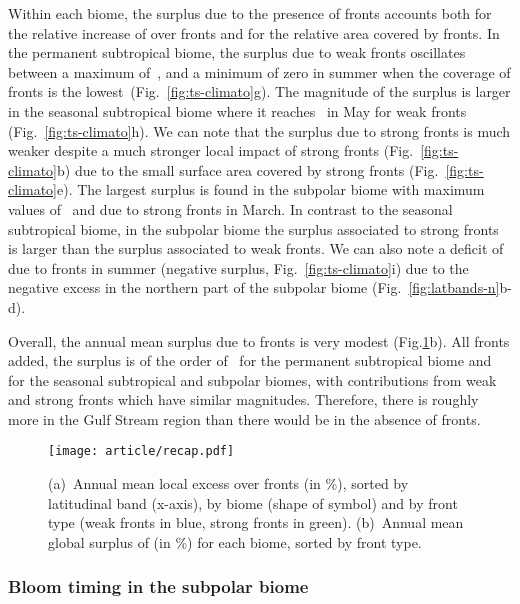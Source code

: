Within each biome, the surplus  due to the presence of fronts accounts both for the relative increase of  over fronts and for the relative area covered by fronts.
In the permanent subtropical biome, the surplus due to weak fronts oscillates between a maximum of~, and a minimum of zero in summer when the coverage of fronts is the lowest~(Fig.~\ref{fig:ts-climato}g).
The magnitude of the surplus is larger in the seasonal subtropical biome where it reaches~ in May for weak fronts (Fig.~\ref{fig:ts-climato}h).
We can note that the surplus due to strong fronts is much weaker despite a much stronger local impact of strong fronts (Fig.~\ref{fig:ts-climato}b) due to the small surface area covered by strong fronts (Fig.~\ref{fig:ts-climato}e).
The largest surplus is found in the subpolar biome with maximum values of~ and due to strong fronts in March.
In contrast to the seasonal subtropical biome, in the subpolar biome the surplus associated to strong fronts is larger than the surplus associated to weak fronts.
We can also note a deficit of  due to fronts in summer (negative surplus, Fig.~\ref{fig:ts-climato}i) due to the negative excess in the northern part of the subpolar biome (Fig.~\ref{fig:latbands-n}b-d).

Overall, the annual mean  surplus due to fronts is very modest (Fig.\ref{fig:recap}b).
All fronts added, the surplus is of the order of~ for the permanent subtropical biome and~ for the seasonal subtropical and subpolar biomes, with contributions from weak and strong fronts which have similar magnitudes.
Therefore, there is roughly~ more  in the Gulf Stream region than there would be in the absence of fronts.

\begin{figure}
  \centering
  \texttt{[image: article/recap.pdf]}
  \caption[Recap of local and global impact of fronts on ]{%
    (a)~Annual mean local   excess over fronts (in \%), sorted by latitudinal band (x-axis),  by biome (shape of symbol) and by front type (weak fronts in blue, strong fronts in green).
    (b)~Annual mean global surplus of  (in \%) for each biome, sorted by front type.
  }%
  \label{fig:recap}
\end{figure}


\subsubsection{Bloom timing in the subpolar biome}

